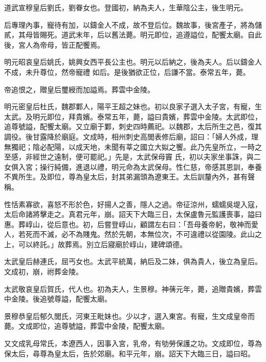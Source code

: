 \begin{pinyinscope}
 道武宣穆皇后劉氏，劉眷女也。登國初，納為夫人，生華陰公主，後生明元。



 后專理內事，寵待有加，以鑄金人不成，故不登后位。魏故事，後宮產子，將為儲貳，其母皆賜死。道武末年，后以舊法薨。明元即位，追遵謚位，配饗太廟。自此後，宮人為帝母，皆正配饗焉。



 明元昭哀皇后姚氏，姚興女西平長公主也。明元以后納之，後為夫人。后以鑄金人不成，未升尊位，然帝寵禮
 如后。是後猶欲正位，后謙不當。泰常五年，薨。



 帝追恨之，贈皇后璽綬而加謚焉。葬雲中金陵。



 明元密皇后杜氏，魏郡鄴人，陽平王超之妹也。初以良家子選入太子宮，有寵，生太武。及明元即位，拜貴嬪。泰常五年，薨，謚曰貴嬪，葬雲中金陵。太武即位，追尊號謚，配饗太廟。又立廟于鄴，刺史四時薦祀。以魏郡，太后所生之邑，復其調役。後甘露降於廟庭。文成時，相州刺史高閭表修后廟，詔曰：「婦人外成，理無獨祀；陰必配陽，以成天地，未聞有莘之國立大姒之饗。此乃先皇所立，一時之至感，非經世之遠制，便可罷祀。」先是，太武保母竇
 氏，初以夫家坐事誅，與二女俱入宮；操行純備，進退以禮，明元命為太武保母。性仁慈，帝感其恩訓，奉養不異所生。及即位，尊為皇太后，封其弟漏頭為遼東王。太后訓釐內外，甚有聲稱。



 性恬素寡欲，喜怒不形於色，好揚人之善，隱人之過。帝征涼州，蠕蠕吳堤入寇，太后命諸將擊走之。真君元年，崩。詔天下大臨三日，太保盧魯元監護喪事，謚曰惠。葬崞山，從后意也。初，后嘗登崞山，顧謂左右曰：「吾母養帝躬，敬神而愛人，若死而不滅，必不為賤鬼。然於先朝，本無位次，不可違禮以從園陵。此山之上，可以終託。」故葬焉。別立后寢廟於崞山，建碑頌德。



 太武皇后赫連氏，屈丐女也。太武平統萬，納后及二妹，俱為貴人，後立為皇后。文成初，崩，祔葬金陵。



 太武敬哀皇后賀氏，代人也。初為夫人，生景穆。神蒨元年，薨，追贈貴嬪，葬雲中金陵。後追號尊謚，配饗太廟。



 景穆恭皇后郁久閭氏，河東王毗妹也。少以才，選入東宮。有寵，生文成皇帝而薨。文成即位，追尊號謚，葬雲中金陵，配饗太廟。



 又文成乳母常氏，本遼西人，因事入宮，乳帝，有劬勞保護之功。文成即位，尊為保太后，尋尊為皇太后，告於郊廟。和平元年，崩。詔天下大臨三日，謚曰昭。




\end{pinyinscope}
